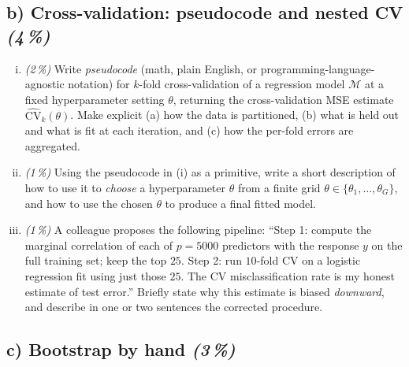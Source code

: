 \documentclass[11pt,a4paper]{article}
\newcommand{\subpoints}[1]{\textit{(#1\,\%)}}
\begin{document}
\subsection*{b) Cross-validation: pseudocode and nested CV \subpoints{4}}

\begin{enumerate}[(i)]
  \item \subpoints{2} Write \emph{pseudocode} (math, plain English, or programming-language-agnostic notation) for $k$-fold cross-validation of a regression model $\mathcal M$ at a fixed hyperparameter setting $\theta$, returning the cross-validation MSE estimate $\widehat{\mathrm{CV}}_k(\theta)$. Make explicit (a) how the data is partitioned, (b) what is held out and what is fit at each iteration, and (c) how the per-fold errors are aggregated.
  \item \subpoints{1} Using the pseudocode in (i) as a primitive, write a short description of how to use it to \emph{choose} a hyperparameter $\theta$ from a finite grid $\theta \in \{\theta_1, \ldots, \theta_G\}$, and how to use the chosen $\theta$ to produce a final fitted model.
  \item \subpoints{1} A colleague proposes the following pipeline: ``Step 1: compute the marginal correlation of each of $p = 5000$ predictors with the response $y$ on the full training set; keep the top $25$. Step 2: run $10$-fold CV on a logistic regression fit using just those $25$. The CV misclassification rate is my honest estimate of test error.'' Briefly state why this estimate is biased \emph{downward}, and describe in one or two sentences the corrected procedure.
\end{enumerate}

\subsection*{c) Bootstrap by hand \subpoints{3}}
\end{document}
